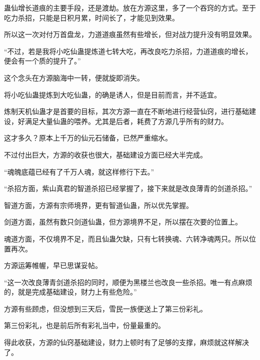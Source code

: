\begin{this_body}
蛊仙增长道痕的主要手段，还是渡劫。放在方源这里，多了一个吞窍的方式。至于吃力杀招，只能是日积月累，时间长了，才能见到效果。

所以这一次对付万首盘龙，力道道痕虽然有些增长，但对战力提升没有明显效果。

“不过，若是我将小吃仙蛊提炼道七转大吃，再改良吃力杀招，力道道痕的增长，便会有一个质的提升了。”

这个念头在方源脑海中一转，便就旋即消失。

将小吃仙蛊提炼到大吃仙蛊，的确是诱人，但是目前而言，并不适宜。

炼制天机仙蛊才是首要的目标，其次方源一直在不断地进行经营仙窍，进行基础建设，好满足大量仙蛊的喂养。尤其是后者，耗费了方源几乎所有的财力。

这才多久？原本上千万的仙元石储备，已然严重缩水。

不过付出巨大，方源的收获也很大，基础建设方面已经大半完成。

“魂魄底蕴已经有了千万人魂，就这样修行下去。”

“杀招方面，紫山真君的智道杀招已经掌握了，接下来就是改良薄青的剑道杀招。”

智道方面，方源有宗师境界，更有智道仙蛊，所以优先掌握。

剑道方面，虽然有数只剑道仙蛊，但方源境界不足，所以摆在次要的位置上。

魂道方面，不仅境界不足，而且仙蛊欠缺，只有七转换魂、六转净魂两只。所以位置再次。

方源运筹帷幄，早已思谋妥帖。

“这一次改良薄青剑道杀招的同时，顺便为黑楼兰也改良一些杀招。唯一有点麻烦的，就是完成基础建设，财力上有些危险。”

方源有些顾虑，但没想到三天后，雪民一族便送上了第三份彩礼。

第三份彩礼，也是前后所有彩礼当中，份量最重的。

得此收获，方源的仙窍基础建设，财力上顿时有了足够的支撑，麻烦就这样解决了。

\end{this_body}

